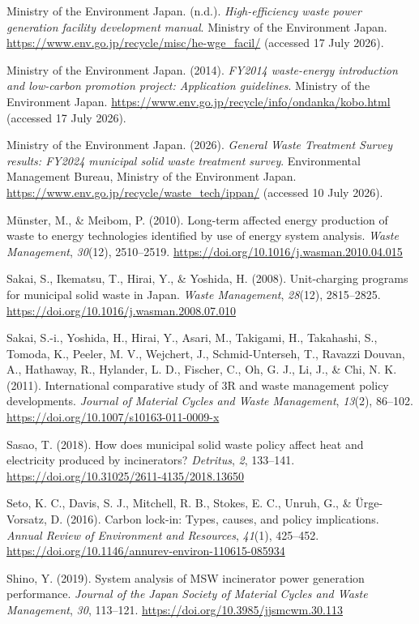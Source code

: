 \documentclass[12pt,a4paper]{article}
\begin{document}
Ministry of the Environment Japan. (n.d.). \textit{High-efficiency waste power
generation facility development manual}. Ministry of the Environment Japan.
\url{https://www.env.go.jp/recycle/misc/he-wge_facil/} (accessed 17 July 2026).

Ministry of the Environment Japan. (2014). \textit{FY2014 waste-energy
introduction and low-carbon promotion project: Application guidelines}.
Ministry of the Environment Japan.
\url{https://www.env.go.jp/recycle/info/ondanka/kobo.html} (accessed 17 July
2026).

Ministry of the Environment Japan. (2026). \textit{General Waste Treatment
Survey results: FY2024 municipal solid waste treatment survey}. Environmental
Management Bureau, Ministry of the Environment Japan.
\url{https://www.env.go.jp/recycle/waste_tech/ippan/} (accessed 10 July 2026).

M\"{u}nster, M., \& Meibom, P. (2010). Long-term affected energy production of
waste to energy technologies identified by use of energy system analysis.
\textit{Waste Management}, \textit{30}(12), 2510--2519.
\url{https://doi.org/10.1016/j.wasman.2010.04.015}

Sakai, S., Ikematsu, T., Hirai, Y., \& Yoshida, H. (2008). Unit-charging
programs for municipal solid waste in Japan. \textit{Waste Management},
\textit{28}(12), 2815--2825.
\url{https://doi.org/10.1016/j.wasman.2008.07.010}

Sakai, S.-i., Yoshida, H., Hirai, Y., Asari, M., Takigami, H., Takahashi, S.,
Tomoda, K., Peeler, M. V., Wejchert, J., Schmid-Unterseh, T., Ravazzi Douvan,
A., Hathaway, R., Hylander, L. D., Fischer, C., Oh, G. J., Li, J., \& Chi, N. K.
(2011). International comparative study of 3R and waste management policy
developments. \textit{Journal of Material Cycles and Waste Management},
\textit{13}(2), 86--102.
\url{https://doi.org/10.1007/s10163-011-0009-x}

Sasao, T. (2018). How does municipal solid waste policy affect heat and
electricity produced by incinerators? \textit{Detritus}, \textit{2}, 133--141.
\url{https://doi.org/10.31025/2611-4135/2018.13650}

Seto, K. C., Davis, S. J., Mitchell, R. B., Stokes, E. C., Unruh, G., \&
\"{U}rge-Vorsatz, D. (2016). Carbon lock-in: Types, causes, and policy
implications. \textit{Annual Review of Environment and Resources},
\textit{41}(1), 425--452.
\url{https://doi.org/10.1146/annurev-environ-110615-085934}

Shino, Y. (2019). System analysis of MSW incinerator power generation
performance. \textit{Journal of the Japan Society of Material Cycles and Waste
Management}, \textit{30}, 113--121.
\url{https://doi.org/10.3985/jjsmcwm.30.113}
\end{document}
